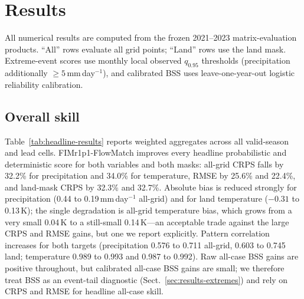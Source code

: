 \documentclass[11pt]{article}
\newcommand{\modelshort}{FIMr1p1}
\newcommand{\methodname}{\modelshort{}-FlowMatch}
\begin{document}
\FloatBarrier

\section{Results}
\label{sec:results}

All numerical results are computed from the frozen 2021--2023 matrix-evaluation products. ``All'' rows evaluate all grid points; ``Land'' rows use the land mask. Extreme-event scores use monthly local observed $q_{0.95}$ thresholds (precipitation additionally $\ge 5$\,mm\,day$^{-1}$), and calibrated BSS uses leave-one-year-out logistic reliability calibration.

\subsection{Overall skill}
\label{sec:results-overall}

Table~\ref{tab:headline-results} reports weighted aggregates across all valid-season and lead cells. \methodname{} improves every headline probabilistic and deterministic score for both variables and both masks: all-grid CRPS falls by 32.2\% for precipitation and 34.0\% for temperature, RMSE by 25.6\% and 22.4\%, and land-mask CRPS by 32.3\% and 32.7\%. Absolute bias is reduced strongly for precipitation (0.44 to 0.19\,mm\,day$^{-1}$ all-grid) and for land temperature ($-0.31$ to 0.13\,K); the single degradation is all-grid temperature bias, which grows from a very small 0.04\,K to a still-small 0.14\,K---an acceptable trade against the large CRPS and RMSE gains, but one we report explicitly. Pattern correlation increases for both targets (precipitation 0.576 to 0.711 all-grid, 0.603 to 0.745 land; temperature 0.989 to 0.993 and 0.987 to 0.992). Raw all-case BSS gains are positive throughout, but calibrated all-case BSS gains are small; we therefore treat BSS as an event-tail diagnostic (Sect.~\ref{sec:results-extremes}) and rely on CRPS and RMSE for headline all-case skill.
\end{document}
